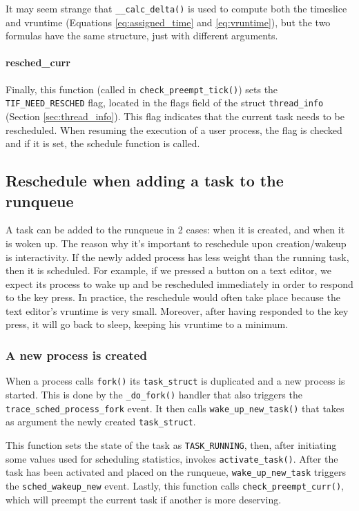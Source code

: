 It may seem strange that \verb|__calc_delta()| is used to compute both the timeslice and vruntime (Equations \ref{eq:assigned_time} and \ref{eq:vruntime}), but the two formulas have the same structure, just with different arguments.

\paragraph{resched\_curr}\label{trace:wake_idle_without_ipi}
Finally, this function (called in \verb|check_preempt_tick()|) sets the \verb|TIF_NEED_RESCHED| flag, located in the flags field of the struct \verb|thread_info| (Section \ref{sec:thread_info}). 
This flag indicates that the current task needs to be rescheduled. When resuming the execution of a user process, the flag is checked and if it is set, the schedule function is called.

\subsection{Reschedule when adding a task to the runqueue}
\label{sec:runqueue_wakeup_reschedule}
A task can be added to the runqueue in 2 cases: when it is created, and when it is woken up. The reason why it's important to reschedule upon creation/wakeup is interactivity. If the newly added process has less weight than the running task, then it is scheduled. For example, if we pressed a button on a text editor, we expect its process to wake up and be rescheduled immediately in order to respond to the key press. In practice, the reschedule would often take place because the text editor's vruntime is very small. Moreover, after having responded to the key press, it will go back to sleep, keeping his vruntime to a minimum.

\subsubsection{A new process is created}
When a process calls \verb|fork()| its \verb|task_struct| is duplicated and a new process is started. This is done by the \verb|_do_fork()| handler that also triggers the \verb|trace_sched_process_fork|\label{trace:sched_process_fork} event. It then calls \verb|wake_up_new_task()| that takes as argument the newly created \verb|task_struct|. 

This function sets the state of the task as \verb|TASK_RUNNING|, then, after initiating some values used for scheduling statistics, invokes \verb|activate_task()|. After the task has been activated and placed on the runqueue, \verb|wake_up_new_task| triggers the \verb|sched_wakeup_new| \label{trace:sched_wakeup_new} event. Lastly, this function calls \verb|check_preempt_curr()|, which will preempt the current task if another is more deserving. 

